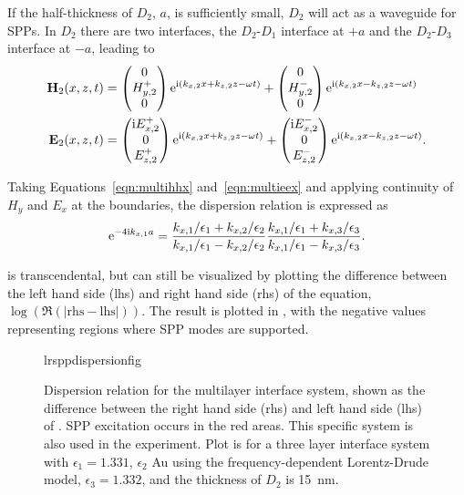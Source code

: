 If the half-thickness of $D_2$, $a$, is sufficiently small, $D_2$ will act
as a waveguide for SPPs.  In $D_2$ there are two interfaces, the
$D_2$-$D_1$ interface at $+a$ and the $D_2$-$D_3$ interface at $-a$,
leading to
\begin{align}
\mathbf{H}_2(x,z,t) &=
\begin{pmatrix}
0\\
H^+_{y,2}\\
0
\end{pmatrix} {\mathrm{e}}^{{\mathrm{i}}(k_{x,2}x+k_{z,2}z-\omega t)}
+
\begin{pmatrix}
0\\
H^-_{y,2}\\
0
\end{pmatrix} {\mathrm{e}}^{{\mathrm{i}}(k_{x,2}x-k_{z,2}z-\omega t)} \label{eqn:multihhx} \\
\mathbf{E}_2(x,z,t) &=
\begin{pmatrix}
{\mathrm{i}} E^+_{x,2}\\
0\\
E^+_{z,2}\\
\end{pmatrix} {\mathrm{e}}^{{\mathrm{i}}(k_{x,2}x+k_{z,2}z-\omega t)}
+
\begin{pmatrix}
{\mathrm{i}} E^-_{x,2}\\
0\\
E^-_{z,2}\\
\end{pmatrix} {\mathrm{e}}^{{\mathrm{i}}(k_{x,2}x-k_{z,2}z-\omega t)}.
\label{eqn:multieex}
\end{align}

Taking Equations~\ref{eqn:multihhx} and~\ref{eqn:multieex} and applying
continuity of $H_y$ and $E_x$ at the boundaries, the dispersion relation is
expressed as
\begin{equation}
{\mathrm{e}}^{-4 {\mathrm{i}} k_{x,1} a} = 
\frac{k_{x,1}/\epsilon_1 + k_{x,2}/\epsilon_2}
     {k_{x,1}/\epsilon_1 - k_{x,2}/\epsilon_2}
\frac{k_{x,1}/\epsilon_1 + k_{x,3}/\epsilon_3}
     {k_{x,1}/\epsilon_1 - k_{x,3}/\epsilon_3}.
\label{eqn:lrsppdispersion}
\end{equation}

 is transcendental, but can still be
visualized by plotting the difference between the left hand side (lhs) and
right hand side (rhs) of the equation, 
$\log\left(\Re\left(|\mathrm{rhs}-\mathrm{lhs}|\right)\right)$.  The result
is plotted in , with the negative
values representing regions where SPP modes are supported.

\begin{figure}[ht]
 \centering
{lrsppdispersionfig}
\caption{Dispersion relation for the multilayer interface system, shown as the difference
 between the right hand side (rhs) and left hand side (lhs) of
.  SPP excitation occurs in the red areas.
This specific system is also used in the experiment.  Plot is for a three
layer interface system with $\epsilon_1=1.331$, $\epsilon_2$ Au using the
frequency-dependent Lorentz-Drude model, $\epsilon_3=1.332$, and the
thickness of $D_2$ is \SI{15}{\nano\meter}.  }
\label{fig:lrsppdispersionrelation}
\end{figure}

